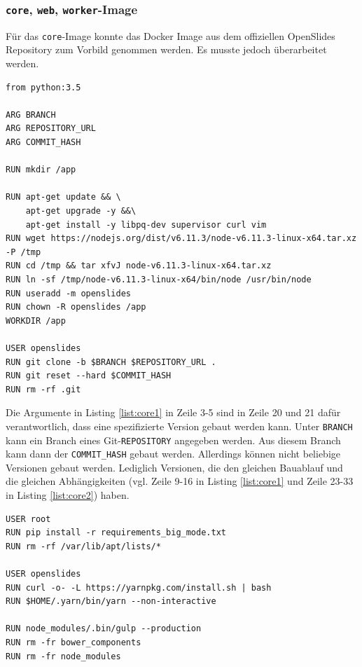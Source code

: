 \documentclass[11pt,a4paper]{article}
\begin{document}
\subsubsection{\texttt{core}, \texttt{web}, \texttt{worker}-Image}
Für das \texttt{core}-Image konnte das Docker Image aus dem offiziellen 
OpenSlides \cite{osgh} Repository zum Vorbild genommen werden. Es musste jedoch 
überarbeitet werden.
\begin{lstlisting}[firstnumber=1,
	caption=Dockerfile für den Bau des \texttt{core} - Teil 1 \cite{osdockcont},
	label={list:core1}]
from python:3.5

ARG BRANCH
ARG REPOSITORY_URL
ARG COMMIT_HASH

RUN mkdir /app

RUN apt-get update && \
	apt-get upgrade -y &&\
	apt-get install -y libpq-dev supervisor curl vim
RUN wget https://nodejs.org/dist/v6.11.3/node-v6.11.3-linux-x64.tar.xz -P /tmp
RUN cd /tmp && tar xfvJ node-v6.11.3-linux-x64.tar.xz
RUN ln -sf /tmp/node-v6.11.3-linux-x64/bin/node /usr/bin/node
RUN useradd -m openslides
RUN chown -R openslides /app
WORKDIR /app

USER openslides
RUN git clone -b $BRANCH $REPOSITORY_URL .
RUN git reset --hard $COMMIT_HASH
RUN rm -rf .git
\end{lstlisting}
Die Argumente in Listing \ref{list:core1} in Zeile 3-5 sind in Zeile 20 und 21 
dafür verantwortlich, dass eine spezifizierte Version gebaut werden kann. Unter 
\texttt{BRANCH} kann ein Branch eines Git-\texttt{REPOSITORY} angegeben werden. 
Aus diesem Branch kann dann der \texttt{COMMIT\_HASH} gebaut werden. Allerdings 
können nicht beliebige Versionen gebaut werden. Lediglich Versionen, die den 
gleichen Bauablauf und die gleichen Abhängigkeiten (vgl. Zeile 9-16 in Listing 
\ref{list:core1} und Zeile 23-33 in Listing \ref{list:core2}) haben.
\begin{lstlisting}[firstnumber=23,
	caption=Dockerfile für den Bau des \texttt{core} - Teil 2 \cite{osdockcont},
	label={list:core2}]
USER root
RUN pip install -r requirements_big_mode.txt
RUN rm -rf /var/lib/apt/lists/*

USER openslides
RUN curl -o- -L https://yarnpkg.com/install.sh | bash
RUN $HOME/.yarn/bin/yarn --non-interactive

RUN node_modules/.bin/gulp --production
RUN rm -fr bower_components
RUN rm -fr node_modules
\end{lstlisting}
\newpage
\end{document}
